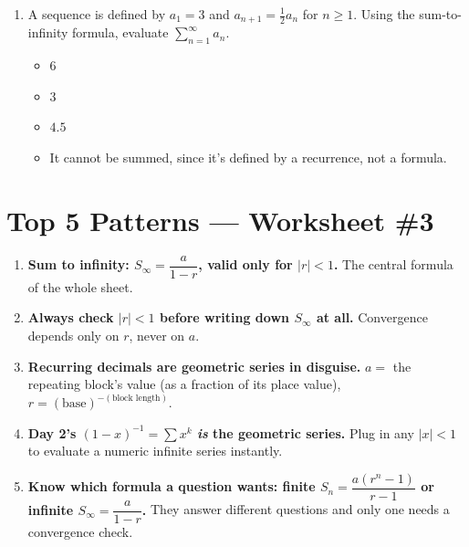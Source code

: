 \documentclass[11pt,a4paper]{article}
\begin{document}
\begin{enumerate}
\item A sequence is defined by $a_1=3$ and $a_{n+1}=\tfrac12a_n$ for $n\geq1$. Using the sum-to-infinity formula, evaluate $\displaystyle\sum_{n=1}^\infty a_n$.
\begin{itemize}
\item[A)] $6$
\item[B)] $3$
\item[C)] $4.5$
\item[D)] It cannot be summed, since it's defined by a recurrence, not a formula.
\end{itemize}


\end{enumerate}

\section*{Top 5 Patterns --- Worksheet \#3}
\begin{enumerate}[leftmargin=2em,itemsep=4pt]
  \item \textbf{Sum to infinity: $S_\infty=\dfrac a{1-r}$, valid only for $|r|<1$.} The central formula of the whole sheet. 
  \item \textbf{Always check $|r|<1$ before writing down $S_\infty$ at all.} Convergence depends only on $r$, never on $a$. 
  \item \textbf{Recurring decimals are geometric series in disguise.} $a=$ the repeating block's value (as a fraction of its place value), $r=(\text{base})^{-(\text{block length})}$. 
  \item \textbf{Day 2's $(1-x)^{-1}=\sum x^k$ \emph{is} the geometric series.} Plug in any $|x|<1$ to evaluate a numeric infinite series instantly. 
  \item \textbf{Know which formula a question wants: finite $S_n=\dfrac{a(r^n-1)}{r-1}$ or infinite $S_\infty=\dfrac a{1-r}$.} They answer different questions and only one needs a convergence check. 
\end{enumerate}
\end{document}
